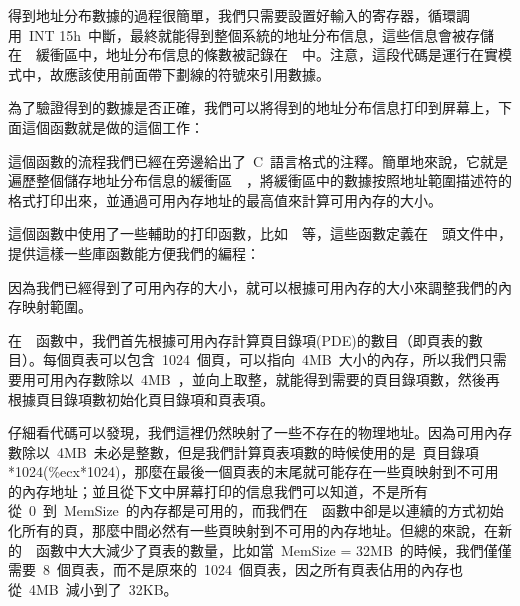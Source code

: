 得到地址分布數據的過程很簡單，我們只需要設置好輸入的寄存器，循環調用~INT 15h~中斷，最終就能得到整個系統的地址分布信息，這些信息會被存儲在~~緩衝區中，地址分布信息的條數被記錄在~~中。注意，這段代碼是運行在實模式中，故應該使用前面帶下劃線的符號來引用數據。

為了驗證得到的數據是否正確，我們可以將得到的地址分布信息打印到屏幕上，下面這個函數就是做的這個工作：


這個函數的流程我們已經在旁邊給出了~C~語言格式的注釋。簡單地來說，它就是遍歷整個儲存地址分布信息的緩衝區~~，將緩衝區中的數據按照地址範圍描述符的格式打印出來，並通過可用內存地址的最高值來計算可用內存的大小。

這個函數中使用了一些輔助的打印函數，比如~~等，這些函數定義在~~頭文件中，提供這樣一些庫函數能方便我們的編程：


因為我們已經得到了可用內存的大小，就可以根據可用內存的大小來調整我們的內存映射範圍。


在~~函數中，我們首先根據可用內存計算頁目錄項(PDE)的數目（即頁表的數目）。每個頁表可以包含~1024~個頁，可以指向~4MB~大小的內存，所以我們只需要用可用內存數除以~4MB~，並向上取整，就能得到需要的頁目錄項數，然後再根據頁目錄項數初始化頁目錄項和頁表項。

仔細看代碼可以發現，我們這裡仍然映射了一些不存在的物理地址。因為可用內存數除以~4MB~未必是整數，但是我們計算頁表項數的時候使用的是~頁目錄項*1024(\%ecx*1024)，那麼在最後一個頁表的末尾就可能存在一些頁映射到不可用的內存地址；並且從下文中屏幕打印的信息我們可以知道，不是所有從~0~到~MemSize~的內存都是可用的，而我們在~~函數中卻是以連續的方式初始化所有的頁，那麼中間必然有一些頁映射到不可用的內存地址。但總的來說，在新的~~函數中大大減少了頁表的數量，比如當~MemSize = 32MB~的時候，我們僅僅需要~8~個頁表，而不是原來的~1024~個頁表，因之所有頁表佔用的內存也從~4MB~減小到了~32KB。

